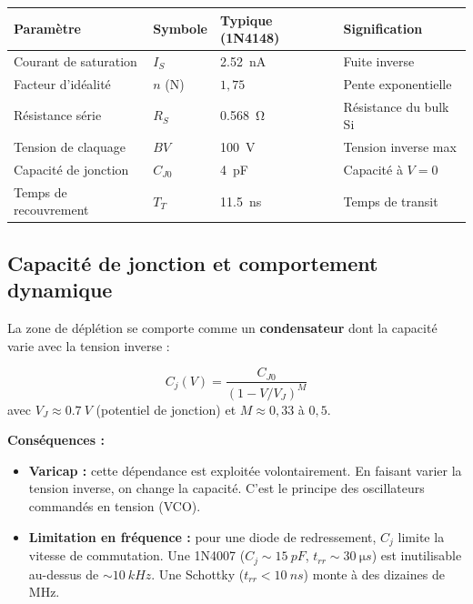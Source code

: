 \documentclass[12pt,a4paper,twoside]{book}
\begin{document}
\begin{center}
\begin{tabular}{llll}
\toprule
\textbf{Paramètre} & \textbf{Symbole} & \textbf{Typique (1N4148)} & \textbf{Signification} \\
\midrule
Courant de saturation & $I_S$ & \SI{2.52}{nA} & Fuite inverse \\
Facteur d'idéalité & $n$ (N) & $1{,}75$ & Pente exponentielle \\
Résistance série & $R_S$ & \SI{0.568}{\ohm} & Résistance du bulk Si \\
Tension de claquage & $BV$ & \SI{100}{V} & Tension inverse max \\
Capacité de jonction & $C_{J0}$ & \SI{4}{pF} & Capacité à $V = 0$ \\
Temps de recouvrement & $T_T$ & \SI{11.5}{ns} & Temps de transit \\
\bottomrule
\end{tabular}
\end{center}

\subsection{Capacité de jonction et comportement dynamique}

La zone de déplétion se comporte comme un \textbf{condensateur} dont la capacité varie avec la tension inverse :

\begin{formule}
\[
C_j(V) = \frac{C_{J0}}{(1 - V/V_J)^M}
\]
avec $V_J \approx \SI{0.7}{V}$ (potentiel de jonction) et $M \approx 0{,}33$ à $0{,}5$.
\end{formule}

\begin{pratique}
\textbf{Conséquences :}
\begin{itemize}[nosep]
\item \textbf{Varicap :} cette dépendance est exploitée volontairement. En faisant varier la tension inverse, on change la capacité. C'est le principe des oscillateurs commandés en tension (VCO).
\item \textbf{Limitation en fréquence :} pour une diode de redressement, $C_j$ limite la vitesse de commutation. Une 1N4007 ($C_j \sim \SI{15}{pF}$, $t_{rr} \sim \SI{30}{\micro s}$) est inutilisable au-dessus de $\sim\SI{10}{kHz}$. Une Schottky ($t_{rr} < \SI{10}{ns}$) monte à des dizaines de MHz.
\end{itemize}
\end{pratique}
\end{document}
